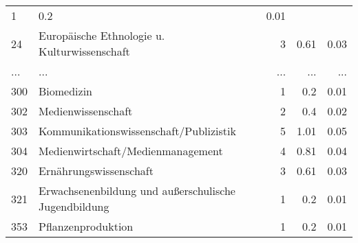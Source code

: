 \begin{longtable}{lXrrr}
          \num{1} &
          \num[round-mode=places,round-precision=2]{0,2} &
          \num[round-mode=places,round-precision=2]{0,01} \\
        24 & \multicolumn{1}{X}{Europäische Ethnologie u. Kulturwissenschaft} & %
          \num{3} &
          \num[round-mode=places,round-precision=2]{0,61} &
          \num[round-mode=places,round-precision=2]{0,03} \\
       ... & ... & ... & ... & ... \\
        300 & \multicolumn{1}{X}{Biomedizin} & %
          \num{1} &
          \num[round-mode=places,round-precision=2]{0,2} &
          \num[round-mode=places,round-precision=2]{0,01} \\

        302 & \multicolumn{1}{X}{Medienwissenschaft} & %
          \num{2} &
          \num[round-mode=places,round-precision=2]{0,4} &
          \num[round-mode=places,round-precision=2]{0,02} \\

        303 & \multicolumn{1}{X}{Kommunikationswissenschaft/Publizistik} & %
          \num{5} &
          \num[round-mode=places,round-precision=2]{1,01} &
          \num[round-mode=places,round-precision=2]{0,05} \\

        304 & \multicolumn{1}{X}{Medienwirtschaft/Medienmanagement} & %
          \num{4} &
          \num[round-mode=places,round-precision=2]{0,81} &
          \num[round-mode=places,round-precision=2]{0,04} \\

        320 & \multicolumn{1}{X}{Ernährungswissenschaft} & %
          \num{3} &
          \num[round-mode=places,round-precision=2]{0,61} &
          \num[round-mode=places,round-precision=2]{0,03} \\

        321 & \multicolumn{1}{X}{Erwachsenenbildung und außerschulische Jugendbildung} & %
          \num{1} &
          \num[round-mode=places,round-precision=2]{0,2} &
          \num[round-mode=places,round-precision=2]{0,01} \\

        353 & \multicolumn{1}{X}{Pflanzenproduktion} & %
          \num{1} &
          \num[round-mode=places,round-precision=2]{0,2} &
          \num[round-mode=places,round-precision=2]{0,01} \\


\end{longtable}

